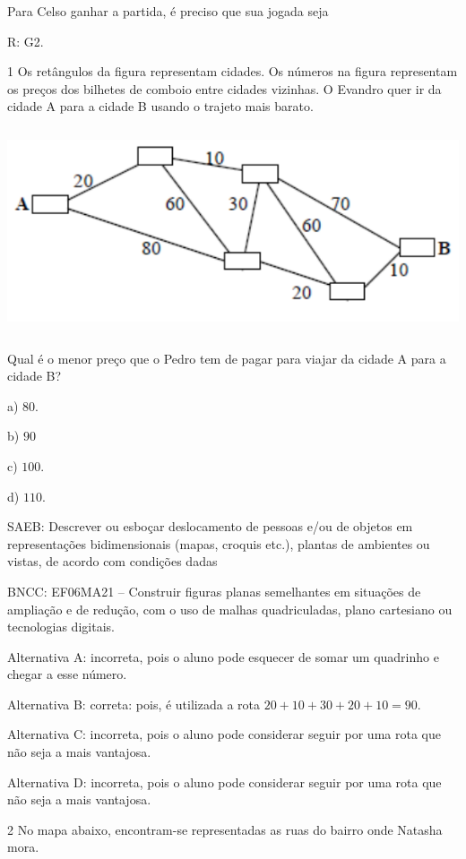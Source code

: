 Para Celso ganhar a partida, é preciso que sua jogada seja

R: G2.


\num{1}  Os retângulos da figura representam cidades. Os números na figura
representam os preços dos bilhetes de comboio entre cidades vizinhas. O
Evandro quer ir da cidade A para a cidade B usando o trajeto mais
barato.

\includegraphics[width=5.90625in,height=2.38542in]{./imgSAEB_6_MAT/media/image74.png}

Qual é o menor preço que o Pedro tem de pagar para viajar da cidade A
para a cidade B?

a) $80$.

b) $90$

c) $100$.

d) $110$.

SAEB: Descrever ou esboçar deslocamento de pessoas e/ou de objetos em
representações bidimensionais (mapas, croquis etc.), plantas de
ambientes ou vistas, de acordo com condições dadas

BNCC: EF06MA21 -- Construir figuras planas semelhantes em situações de
ampliação e de redução, com o uso de malhas quadriculadas, plano
cartesiano ou tecnologias digitais.

Alternativa A: incorreta, pois o aluno pode esquecer de somar um
quadrinho e chegar a esse número.

Alternativa B: correta: pois, é utilizada a rota $20 + 10 + 30 + 20 + 10 = 90$.

Alternativa C: incorreta, pois o aluno pode considerar seguir por uma
rota que não seja a mais vantajosa.

Alternativa D: incorreta, pois o aluno pode considerar seguir por uma
rota que não seja a mais vantajosa.

\num{2}  No mapa abaixo, encontram-se representadas as ruas do bairro onde
Natasha mora.

